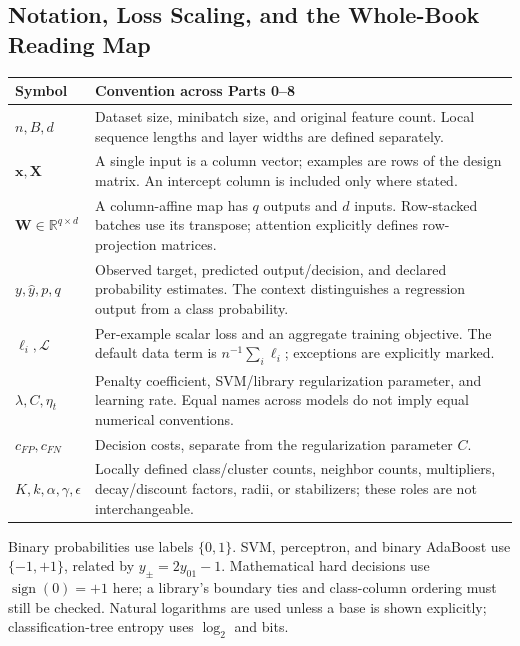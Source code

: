 \documentclass[11pt,twoside]{article}
\numberwithin{equation}{section}
\newcommand{\R}{\mathbb{R}}
\newcommand{\vect}[1]{\bm{#1}}
\newcommand{\mat}[1]{\bm{#1}}
\newcommand{\Loss}{\mathcal{L}}
\theoremstyle{plain}
\theoremstyle{definition}
\theoremstyle{remark}
\begin{document}
\subsection{Notation, Loss Scaling, and the Whole-Book Reading Map}
\label{sec:notation-loss}
\begin{center}\small
\begin{tabular}{@{}p{3.1cm}p{11.8cm}@{}}\toprule
Symbol & Convention across Parts 0--8\\\midrule
$n,B,d$ & Dataset size, minibatch size, and original feature count. Local sequence lengths and layer widths are defined separately.\\
$\vect x,\mat X$ & A single input is a column vector; examples are rows of the design matrix. An intercept column is included only where stated.\\
$\mat W\in\R^{q\times d}$ & A column-affine map has $q$ outputs and $d$ inputs. Row-stacked batches use its transpose; attention explicitly defines row-projection matrices.\\
$y,\hat y,p,q$ & Observed target, predicted output/decision, and declared probability estimates. The context distinguishes a regression output from a class probability.\\
$\ell_i,\Loss$ & Per-example scalar loss and an aggregate training objective. The default data term is $n^{-1}\sum_i\ell_i$; exceptions are explicitly marked.\\
$\lambda,C,\eta_t$ & Penalty coefficient, SVM/library regularization parameter, and learning rate. Equal names across models do not imply equal numerical conventions.\\
$c_{FP},c_{FN}$ & Decision costs, separate from the regularization parameter $C$.\\
$K,k,\alpha,\gamma,\epsilon$ & Locally defined class/cluster counts, neighbor counts, multipliers, decay/discount factors, radii, or stabilizers; these roles are not interchangeable.\\\bottomrule
\end{tabular}\end{center}
Binary probabilities use labels $\{0,1\}$. SVM, perceptron, and binary AdaBoost
use $\{-1,+1\}$, related by $y_{\pm}=2y_{01}-1$. Mathematical hard decisions
use $\operatorname{sign}(0)=+1$ here; a library's boundary ties and class-column
ordering must still be checked. Natural logarithms are used unless a base is
shown explicitly; classification-tree entropy uses $\log_2$ and bits.
\end{document}
